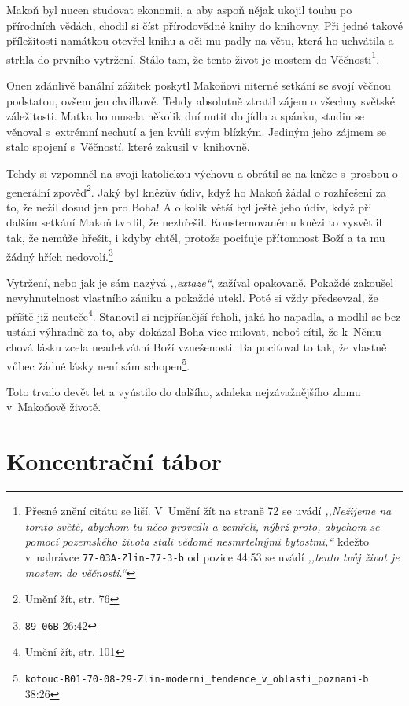 Makoň byl nucen studovat ekonomii, a aby aspoň nějak ukojil touhu po přírodních
vědách, chodil si číst přírodovědné knihy do knihovny. Při jedné takové
příležitosti namátkou otevřel knihu a oči mu padly na větu, která ho uchvátila a
strhla do prvního vytržení. Stálo tam, že tento život je mostem do
Věčnosti\footnote{Přesné znění citátu se liší. V~Umění žít na straně 72 se
uvádí \textit{,,Nežijeme na tomto světě, abychom tu něco provedli a zemřeli,
nýbrž proto, abychom se pomocí pozemského života stali vědomě nesmrtelnými
bytostmi,``} kdežto v~nahrávce \texttt{77-03A-Zlin-77-3-b} od pozice 44:53 se
uvádí \textit{,,tento tvůj život je mostem do věčnosti.``}}.

Onen zdánlivě banální zážitek poskytl Makoňovi niterné setkání se svojí věčnou
podstatou, ovšem jen chvilkově. Tehdy absolutně ztratil zájem o všechny světské
záležitosti. Matka ho musela několik dní nutit do jídla a spánku, studiu se
věnoval s~extrémní nechutí a jen kvůli svým blízkým. Jediným jeho zájmem se
stalo spojení s~Věčností, které zakusil v~knihovně.

Tehdy si vzpomněl na svoji katolickou výchovu a obrátil se na kněze s~prosbou o
generální zpověď\footnote{Umění žít, str. 76}. Jaký byl knězův údiv, když ho Makoň žádal o rozhřešení za to,
že nežil dosud jen pro Boha! A o kolik větší byl ještě jeho údiv, když při
dalším setkání Makoň tvrdil, že nezhřešil. Konsternovanému knězi to vysvětlil
tak, že nemůže hřešit, i kdyby chtěl, protože pociťuje přítomnost Boží a ta mu
žádný hřích nedovolí.\footnote{\texttt{89-06B} 26:42}

Vytržení, nebo jak je sám nazývá \textit{,,extaze``}, zažíval opakovaně. Pokaždé
zakoušel nevyhnutelnost vlastního zániku a pokaždé utekl. Poté si vždy
předsevzal, že příště již neuteče\footnote{Umění žít, str. 101}. Stanovil si nejpřísnější řeholi, jaká ho
napadla, a modlil se bez ustání výhradně za to, aby dokázal Boha více milovat,
neboť cítil, že k~Němu chová lásku zcela neadekvátní Boží vznešenosti. Ba
pociťoval to tak, že vlastně vůbec žádné lásky není sám
schopen\footnote{\texttt{kotouc-B01-70-08-29-Zlin-moderni\_tendence\_v\_oblasti\_poznani-b} 38:26}.

Toto trvalo devět let a vyústilo do dalšího, zdaleka nejzávažnějšího zlomu
v~Makoňově životě.

\section{Koncentrační tábor}

